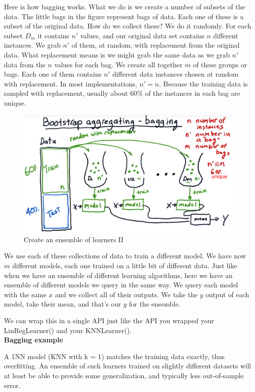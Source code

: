 \documentclass[12pt]{article}
\begin{document}
Here is how bagging works. What we do is we create a number of subsets of the data. The little bags in the figure represent bags of data. Each one of these is a subset of the original data. How do we collect these? We do it randomly. For each subset $D_m$ it contains $n'$ values, and our original data set contains $n$ different instances. We grab $n'$ of them, at random, with replacement from the original data. What replacement means is we might grab the same data as we grab $n'$ data from the $n$ values for each bag. We create all together $m$ of these groups or bags. Each one of them contains $n'$ different data instances chosen at random with replacement. In most implementations, $n' = n$. Because the training data is sampled with replacement, usually about 60\% of the instances in each bag are unique.

\begin{figure}[!ht]
\centering
\includegraphics[scale=0.5]{fig/fig94}
\caption{Create an ensemble of learners II}
\end{figure}

We use each of these collections of data to train a different model. We have now $m$ different models, each one trained on a little bit of different data. Just like when we have an ensemble of different learning algorithms, here we have an ensemble of different models we query in the same way. We query each model with the same $x$ and we collect all of their outputs. We take the $y$ output of each model, take their mean, and that's our $y$ for the ensemble. 

We can wrap this in a single API just like the API you wrapped your LinRegLearner() and your KNNLearner(). \\[8pt]
\noindent
\textbf{Bagging example}

A 1NN model (KNN with k = 1) matches the training data exactly, thus overfitting. An ensemble of such learners trained on slightly different datasets will at least be able to provide some generalization, and typically less out-of-sample error.
\end{document}

